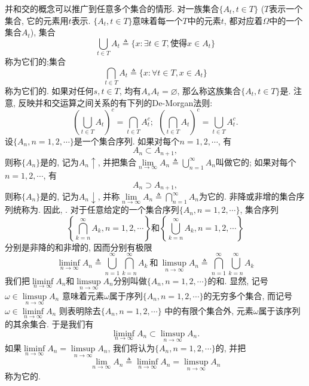 并和交的概念可以推广到任意多个集合的情形. 对一族集合$\{A_t,t\in T\}$ ($T$表示一个集合, 它的元素用$t$表示. $\{A_t,t\in T\}$意味着每一个$T$中的元素$t$, 都对应着$\Omega$中的一个集合$A_t$), 集合
\begin{equation}
\bigcup_{t\in T}A_t \triangleq \{ x:\exists t\in T,\text{使得} x\in A_t \}
\end{equation}
称为它们的;集合
\begin{equation}
\bigcap_{t\in T}A_t \triangleq \{ x:\forall t\in T, x\in A_t \}
\end{equation}
称为它们的. 如果对任何$s,t\in T$, 均有$A_sA_t = \varnothing$, 那么称这族集合$\{A_t,t\in T\}$是. 注意, 反映并和交运算之间关系的有下列的De-Morgan法则:
\begin{equation}
\left(\bigcup_{t\in T}A_t\right)^c = \bigcap_{t\in T}A_t^c;~~\left(\bigcap_{t\in T}A_t\right)^c = \bigcup_{t\in T}A_t^c.\label{eq:De-Morgan}
\end{equation}
设$\{A_n,n=1,2,\cdots\}$是一个集合序列. 如果对每个$n = 1,2,\cdots$, 有\begin{equation}
A_n\subset A_{n+1},
\end{equation}
则称$\{A_n\}$是的, 记为$A_n\uparrow$, 并把集合$\lim\limits_{n\to\infty}A_n\triangleq \bigcup\limits_{n = 1}^{\infty}A_n$叫做它的; 如果对每个$n = 1,2,\cdots$, 有
\begin{equation}
A_n\supset A_{n+1},
\end{equation}
则称$\{A_n\}$是的, 记为$A_n\downarrow$, 并称$\lim\limits_{n\to\infty}A_n\triangleq \bigcap\limits_{n = 1}^{\infty}A_n$为它的. 非降或非增的集合序列统称为. 因此, . 对于任意给定的一个集合序列$\{A_n,n=1,2,\cdots\}$, 集合序列
\begin{equation}
\left\{ \bigcap_{k=n}^\infty A_k,n=1,2,\cdots\right\}\text{和}\left\{ \bigcup_{k=n}^\infty A_k,n=1,2,\cdots\right\}
\end{equation}
分别是非降的和非增的, 因而分别有极限
\begin{equation}
\liminf_{n\to\infty}A_n\triangleq \bigcup_{n=1}^{\infty}\bigcap_{k=n}^{\infty}A_k ~\text{和}~\limsup_{n\to\infty}A_n\triangleq \bigcap_{n=1}^{\infty}\bigcup_{k=n}^{\infty}A_k 
\end{equation}
我们把$\liminf\limits_{n\to\infty}A_n$和$\limsup\limits_{n\to\infty}A_n$分别叫做$\{A_n,n=1,2,\cdots\}$的和. 显然, 记号$\omega\in\limsup\limits_{n\to\infty}A_n$ 意味着元素$\omega$属于序列$\{A_n,n=1,2,\cdots\}$的无穷多个集合, 而记号$\omega\in\liminf\limits_{n\to\infty}A_n$ 则表明除去$\{A_n,n=1,2,\cdots\}$ 中的有限个集合外, 元素$\omega$属于该序列的其余集合. 于是我们有
\begin{equation}
\liminf_{n\to\infty}A_n\subset\limsup_{n\to\infty}A_n.
\end{equation}
如果$\liminf\limits_{n\to\infty}A_n = \limsup\limits_{n\to\infty}A_n$, 我们将认为$\{A_n,n=1,2,\cdots\}$的, 并把
\begin{equation}
\lim_{n\to\infty}A_n \triangleq \liminf_{n\to\infty}A_n = \limsup_{n\to\infty}A_n
\end{equation}
称为它的.

